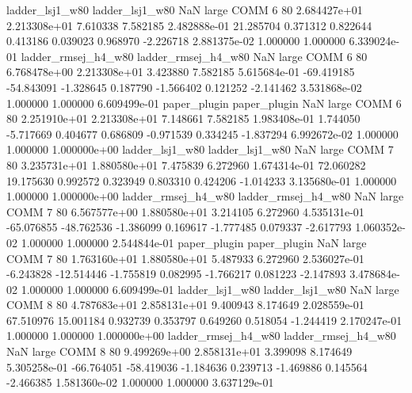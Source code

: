     ladder_lsj1_w80     ladder_lsj1_w80                   NaN      large     COMM                 6 80 2.684427e+01   2.213308e+01      7.610338       7.582185  2.482888e-01     21.285704      0.371312     0.822644       0.413186  0.039023   0.968970    -2.226718   2.881375e-02            1.000000        1.000000        6.339024e-01
ladder_rmsej_h4_w80 ladder_rmsej_h4_w80                   NaN      large     COMM                 6 80 6.768478e+00   2.213308e+01      3.423880       7.582185  5.615684e-01    -69.419185    -54.843091    -1.328645       0.187790 -1.566402   0.121252    -2.141462   3.531868e-02            1.000000        1.000000        6.609499e-01
       paper_plugin        paper_plugin                   NaN      large     COMM                 6 80 2.251910e+01   2.213308e+01      7.148661       7.582185  1.983408e-01      1.744050     -5.717669     0.404677       0.686809 -0.971539   0.334245    -1.837294   6.992672e-02            1.000000        1.000000        1.000000e+00
    ladder_lsj1_w80     ladder_lsj1_w80                   NaN      large     COMM                 7 80 3.235731e+01   1.880580e+01      7.475839       6.272960  1.674314e-01     72.060282     19.175630     0.992572       0.323949  0.803310   0.424206    -1.014233   3.135680e-01            1.000000        1.000000        1.000000e+00
ladder_rmsej_h4_w80 ladder_rmsej_h4_w80                   NaN      large     COMM                 7 80 6.567577e+00   1.880580e+01      3.214105       6.272960  4.535131e-01    -65.076855    -48.762536    -1.386099       0.169617 -1.777485   0.079337    -2.617793   1.060352e-02            1.000000        1.000000        2.544844e-01
       paper_plugin        paper_plugin                   NaN      large     COMM                 7 80 1.763160e+01   1.880580e+01      5.487933       6.272960  2.536027e-01     -6.243828    -12.514446    -1.755819       0.082995 -1.766217   0.081223    -2.147893   3.478684e-02            1.000000        1.000000        6.609499e-01
    ladder_lsj1_w80     ladder_lsj1_w80                   NaN      large     COMM                 8 80 4.787683e+01   2.858131e+01      9.400943       8.174649  2.028559e-01     67.510976     15.001184     0.932739       0.353797  0.649260   0.518054    -1.244419   2.170247e-01            1.000000        1.000000        1.000000e+00
ladder_rmsej_h4_w80 ladder_rmsej_h4_w80                   NaN      large     COMM                 8 80 9.499269e+00   2.858131e+01      3.399098       8.174649  5.305258e-01    -66.764051    -58.419036    -1.184636       0.239713 -1.469886   0.145564    -2.466385   1.581360e-02            1.000000        1.000000        3.637129e-01
